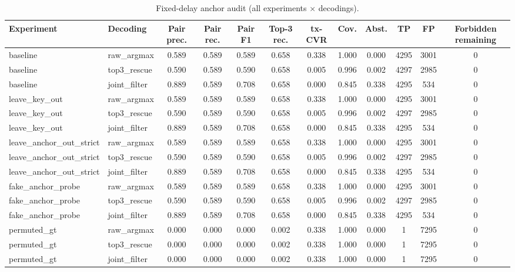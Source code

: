 \documentclass[journal]{IEEEtran}
\begin{document}
\begin{table}[!t]
\caption{Fixed-delay anchor audit (all experiments $\times$ decodings).}
\label{tab:A1}
\centering
\footnotesize
\setlength{\tabcolsep}{3pt}
\begin{tabular}{p{}p{}cccccccccc}
\toprule
Experiment & Decoding & Pair prec. & Pair rec. & Pair F1 & Top-3 rec. & tx-CVR & Cov. & Abst. & TP & FP & Forbidden remaining \\
\midrule
baseline & raw\_argmax & 0.589 & 0.589 & 0.589 & 0.658 & 0.338 & 1.000 & 0.000 & 4295 & 3001 & 0 \\
baseline & top3\_rescue & 0.590 & 0.589 & 0.590 & 0.658 & 0.005 & 0.996 & 0.002 & 4297 & 2985 & 0 \\
baseline & joint\_filter & 0.889 & 0.589 & 0.708 & 0.658 & 0.000 & 0.845 & 0.338 & 4295 & 534 & 0 \\
leave\_key\_out & raw\_argmax & 0.589 & 0.589 & 0.589 & 0.658 & 0.338 & 1.000 & 0.000 & 4295 & 3001 & 0 \\
leave\_key\_out & top3\_rescue & 0.590 & 0.589 & 0.590 & 0.658 & 0.005 & 0.996 & 0.002 & 4297 & 2985 & 0 \\
leave\_key\_out & joint\_filter & 0.889 & 0.589 & 0.708 & 0.658 & 0.000 & 0.845 & 0.338 & 4295 & 534 & 0 \\
leave\_anchor\_out\_strict & raw\_argmax & 0.589 & 0.589 & 0.589 & 0.658 & 0.338 & 1.000 & 0.000 & 4295 & 3001 & 0 \\
leave\_anchor\_out\_strict & top3\_rescue & 0.590 & 0.589 & 0.590 & 0.658 & 0.005 & 0.996 & 0.002 & 4297 & 2985 & 0 \\
leave\_anchor\_out\_strict & joint\_filter & 0.889 & 0.589 & 0.708 & 0.658 & 0.000 & 0.845 & 0.338 & 4295 & 534 & 0 \\
fake\_anchor\_probe & raw\_argmax & 0.589 & 0.589 & 0.589 & 0.658 & 0.338 & 1.000 & 0.000 & 4295 & 3001 & 0 \\
fake\_anchor\_probe & top3\_rescue & 0.590 & 0.589 & 0.590 & 0.658 & 0.005 & 0.996 & 0.002 & 4297 & 2985 & 0 \\
fake\_anchor\_probe & joint\_filter & 0.889 & 0.589 & 0.708 & 0.658 & 0.000 & 0.845 & 0.338 & 4295 & 534 & 0 \\
permuted\_gt & raw\_argmax & 0.000 & 0.000 & 0.000 & 0.002 & 0.338 & 1.000 & 0.000 & 1 & 7295 & 0 \\
permuted\_gt & top3\_rescue & 0.000 & 0.000 & 0.000 & 0.002 & 0.338 & 1.000 & 0.000 & 1 & 7295 & 0 \\
permuted\_gt & joint\_filter & 0.000 & 0.000 & 0.000 & 0.002 & 0.338 & 1.000 & 0.000 & 1 & 7295 & 0 \\
\bottomrule
\end{tabular}
\end{table}
\end{document}
